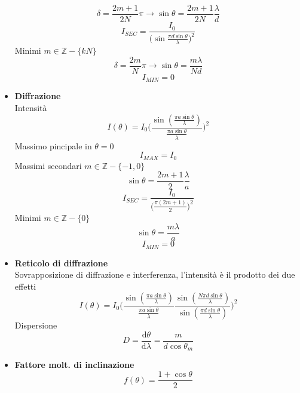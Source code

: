 \documentclass{book}
\newcommand{\g}{\textbf}
\newcommand{\e}{\begin{equation}}
\newcommand{\ex}{\end{equation} }
\renewcommand{\it}{\item[$\cdot$]}
\begin{document}
\begin{multicols}{4}
\begin{itemize}
    \e{\delta=\frac{2m+1}{2N}\pi \rightarrow \sin\theta=\frac{2m+1}{2N}\frac{\lambda}{d}} \ex
    \e{I_{SEC}=\frac{I_0}{\bigl(\sin\frac{\pi d \sin\theta}{\lambda} \bigr)^2}} \ex
    Minimi $m\in\mathbb{Z}-\{kN\}$
    \e{\delta=\frac{2m}{N}\pi \rightarrow \sin\theta=\frac{m\lambda}{Nd}} \ex
    \e{I_{MIN}=0}\ex
    \it \g{Diffrazione} \\
    Intensità
    \e{I(\theta)=I_{0}\biggl(\frac{\sin(\frac{\pi a \sin\theta}{\lambda})}{\frac{\pi a \sin\theta}{\lambda}} \biggr)^2} \ex
    Massimo pincipale in $\theta=0$ \\
    \e{I_{MAX}=I_0} \ex
    Massimi secondari $m\in\mathbb{Z}-\{-1,0\}$
    \e{\sin\theta=\frac{2m+1}{2}\frac{\lambda}{a}} \ex
    \e{I_{SEC}=\frac{I_0}{\bigl( \frac{\pi(2m+1)}{2} \bigr)^2}} \ex
    Minimi $m\in\mathbb{Z}-\{0\}$
    \e{\sin\theta=\frac{m\lambda}{a}}\ex
    \e{I_{MIN}=0}\ex
    \it \g{Reticolo di diffrazione} \\
    Sovrapposizione di diffrazione e interferenza, l'intensità è il prodotto dei due effetti \\
    \e{I(\theta)=I_0 \biggl( \frac{\sin(\frac{\pi a \sin\theta}{\lambda})}{\frac{\pi a \sin\theta}{\lambda}} 
    \frac{\sin(\frac{N\pi d \sin\theta}{\lambda})}{\sin(\frac{\pi d \sin\theta}{\lambda})}   \biggr)^2}\ex
    Dispersione
    \e{D=\frac{\mathrm{d}\theta}{\mathrm{d}\lambda}=\frac{m}{d\cos\theta_m}}\ex
    \it \g{Fattore molt. di inclinazione}
    \e{f(\theta)=\frac{1+\cos{\theta}}{2}}\ex
\end{itemize}
\end{multicols}

\hline
\end{document}
